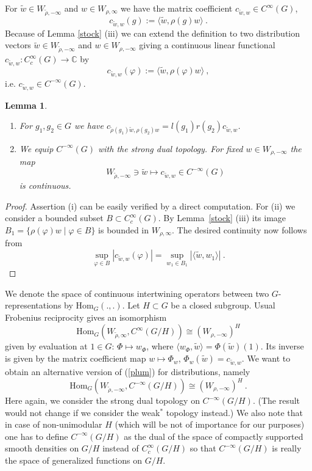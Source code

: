 \documentclass[10]{amsart}
\newtheorem{lem}[thm]{Lemma}
\theoremstyle{remark}
\theoremstyle{definition}
\numberwithin{equation}{section}
\newcommand{\C}{\mathbb{C}}           %
\newcommand{\Hom}{\mathrm{Hom}}
\newcommand{\vp}{\varphi}
\newcommand{\be}{\begin{equation}}
\begin{document}
{For $\tilde w\in W_{\tilde\rho,-\infty}$ and $w\in W_{\rho,\infty}$ we have the matrix coefficient $c_{\tilde w,w}\in C^\infty(G)$,
$$ c_{\tilde w,w}(g):=\langle \tilde w, \rho(g)w\rangle\ .$$
Because of Lemma \ref{stock} (iii) we can extend the definition to two distribution vectors $\tilde w\in W_{\tilde\rho,-\infty}$ and $w\in W_{\rho,-\infty}$
giving a continuous linear functional $c_{\tilde w,w}:C_c^\infty(G)\rightarrow \C$ by 
$$ c_{\tilde w,w}(\vp):=\langle \tilde w, \rho(\vp)w\rangle\ ,$$
 i.e. $c_{\tilde w,w}\in C^{-\infty}(G)$.
\begin{lem}\label{stein}
\begin{enumerate}
\item[(i)]  For $g_1,g_2\in G$ we have $c_{\tilde\rho(g_1)\tilde w,\rho(g_2)w}=l(g_1)r(g_2) c_{\tilde w,w}$.
\item[(ii)] We equip $ C^{-\infty}(G)$ with the strong dual topology. For fixed $w\in W_{\rho,-\infty}$ the map
$$  W_{\tilde\rho,-\infty}\ni\tilde w\mapsto c_{\tilde w,w}\in C^{-\infty}(G)$$
is continuous.
\end{enumerate}
\end{lem}
\begin{proof} 
Assertion (i) can be easily verified by a direct computation. For (ii) we consider a bounded subset $B\subset C_c^\infty(G)$. By Lemma~\ref{stock} (iii)
its image $B_1=\{\rho(\vp)w\mid \vp\in B\}$ is bounded in $W_{\rho,\infty}$. The desired continuity now follows from
$$ \sup_{\vp\in B} |c_{\tilde w,w}(\vp)|= \sup_{w_1\in B_1}|\langle \tilde w,w_1\rangle|\ .$$
\end{proof}

We denote the space of continuous intertwining operators between two $G$-representations by $\Hom_G(.,.)$.  Let $H\subset G$ be a closed subgroup. Usual Frobenius reciprocity gives an isomorphism 
\be\label{plum} \Hom_G(W_{\tilde\rho,\infty},C^\infty(G/H))\cong (W_{\rho,-\infty})^H
\end{equation}
given by evaluation at $1\in G$: $\Phi\mapsto w_\Phi$, where $\langle w_\Phi,\tilde w\rangle=\Phi(\tilde w)(1)$.
Its inverse is given by the matrix coefficient map $w\mapsto \Phi_w$, $\Phi_w(\tilde w)=c_{\tilde w,w}$.
We want to obtain an alternative version of (\ref{plum}) for distributions, namely
$$  \Hom_G(W_{\tilde\rho,-\infty},C^{-\infty}(G/H))\cong (W_{\rho,-\infty})^H\ .$$
Here again, we consider the strong dual topology on $C^{-\infty}(G/H)$. (The result would not change if we consider the weak$^*$ topology instead.)
We also note that in case of non-unimodular $H$ (which will be not of importance for our purposes) one has to define $C^{-\infty}(G/H)$ as the dual of the space
of compactly supported smooth densities on $G/H$ instead of $C_c^\infty(G/H)$ so that $C^{-\infty}(G/H)$ is really the space of generalized functions
on $G/H$.

}
\end{document}
